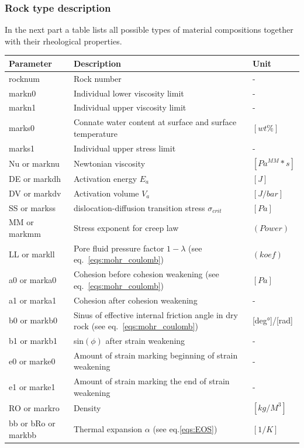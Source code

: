 \subsubsection{Rock type description}

In the next part a table lists all possible types of material compositions together with their rheological properties.

\begin{table}[H]
	\small
	\centering
	\begin{tabular}{l p{8cm} l}
		\toprule
		Parameter & Description & Unit\\
		\midrule
		rocknum & Rock number & - \\ 
		markn0 & Individual lower viscosity limit & - \\ 
		markn1 & Individual upper viscosity limit & - \\ 
		marks0 & Connate water content at surface and surface temperature & $[wt\%]$ \\ 
		marks1 & Individual upper stress limit & - \\ 
		Nu or marknu & Newtonian viscosity & $[Pa^{MM}*s]$ \\ 
		DE or markdh & Activation energy $E_a$ & $[J]$\\ 
		DV or markdv & Activation volume $V_a$ & $[J/bar]$ \\ 
		SS or markss & dislocation-diffusion transition stress $\sigma_{crit}$ & $[Pa]$ \\ 
		MM or markmm & Stress exponent for creep law & $(Power)$ \\ 
		LL or markll & Pore fluid pressure factor $1-\lambda$ (see eq.~\ref{eqs:mohr_coulomb}) & $(koef)$ \\ 
		a0 or marka0 & Cohesion before cohesion weakening (see eq.~\ref{eqs:mohr_coulomb}) & $[Pa]$ \\
		a1 or marka1 & Cohesion after cohesion weakening & - \\
		b0 or markb0 & Sinus of effective internal friction angle in dry rock (see eq.~\ref{eqs:mohr_coulomb}) & [deg°]/[rad] \\
		b1 or markb1 & sin$(\phi)$ after strain weakening & - \\
		e0 or marke0 & Amount of strain marking beginning of strain weakening  & - \\
		e1 or marke1 & Amount of strain marking the end of strain weakening  & - \\ 
		RO or markro & Density & $[kg/M^3]$ \\ 
		bb or bRo or markbb & Thermal expansion $\alpha$ (see eq.\ref{eqs:EOS}) & $[1/K]$ \\ 

\end{tabular}
\end{table}
